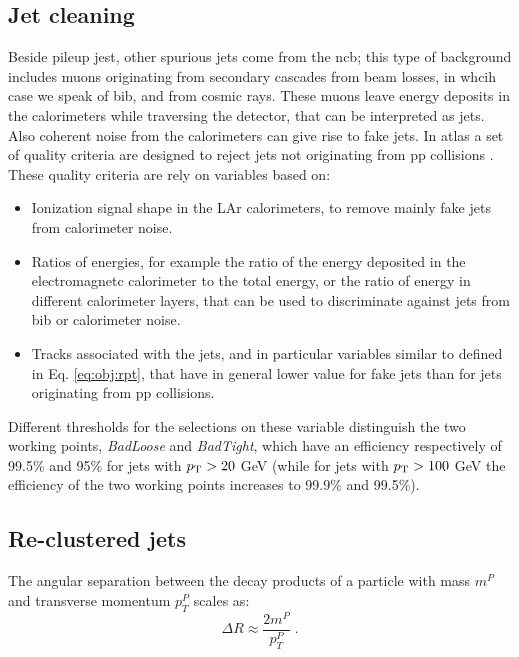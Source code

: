 \subsection{Jet cleaning}
\label{sec:jetcleaning}

Beside pileup jest, other spurious jets come from the \gls{ncb}; this type of background includes muons originating from secondary cascades from beam losses, in whcih case we speak of \gls{bib}, and from cosmic rays. These muons leave energy deposits in the calorimeters while traversing the detector, that can be interpreted as jets. Also coherent noise from the calorimeters can give rise to fake jets. In \gls{atlas} a set of quality criteria are designed to reject jets not originating from \gls{pp} collisions \cite{TheATLAScollaboration:2015ofz}. These quality criteria are rely on variables based on:
\begin{itemize}
\item Ionization signal shape in the LAr calorimeters, to remove mainly fake jets from calorimeter noise. 
\item Ratios of energies, for example the ratio of the energy deposited in the electromagnetc calorimeter to the total energy, or the ratio of energy in different calorimeter layers, that can be used to discriminate against jets from \gls{bib} or calorimeter noise.
\item Tracks associated with the jets, and in particular variables similar to \RpT defined in Eq. \ref{eq:obj:rpt}, that have in general lower value for fake jets than for jets originating from \gls{pp} collisions. 
\end{itemize} 

Different thresholds for the selections on these variable distinguish the two working points, \textit{BadLoose} and \textit{BadTight}, which have an efficiency respectively of 99.5\% and 95\% for jets with $p_{\rm T} > 20$ GeV (while for jets with $p_{\rm T} > 100$ GeV the efficiency of the two working points increases to 99.9\% and 99.5\%). 

\subsection{Re-clustered jets}
\label{sec:reclustering}

The angular separation between the decay products of a particle with mass $m^P$ and transverse momentum 
$p_T^P$ scales as:
\begin{equation}
\Delta R \approx \frac{2 m^P}{p_T^P} \; .
\end{equation}

